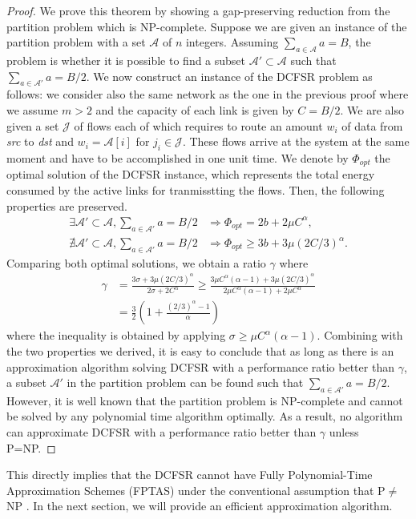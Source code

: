 \documentclass[10pt, conference, compsocconf]{IEEEtran}
\begin{document}
\begin{proof}
We prove this theorem by showing a gap-preserving reduction from the partition problem which is NP-complete. Suppose we are given an instance of the partition problem with a set $\mathcal{A}$ of $n$ integers. Assuming $\sum_{a \in \mathcal{A}} a = B$, the problem is whether it is possible to find a subset $\mathcal{A}' \subset \mathcal{A}$ such that $\sum_{a \in \mathcal{A}'} a = B/2$.  We now construct an instance of the DCFSR problem as follows:  we consider also the same network as the one in the previous proof where we assume $m > 2$ and the capacity of each link is given by $C = B/2$. We are also given a set $\mathcal{J}$ of flows each of which requires to route an amount $w_i$ of data from \emph{src} to \emph{dst} and $w_i = \mathcal{A}[i]$ for $j_i \in \mathcal{J}$. These flows arrive at the system at the same moment and have to be accomplished in one unit time. We denote by $\Phi_{opt}$ the optimal solution of the DCFSR instance, which represents the total energy consumed by the active links for tranmisstting the flows. Then, the following properties are preserved.
	\begin{align}
		\exists \mathcal{A}' \subset \mathcal{A}, \sum_{a \in \mathcal{A}'} a = B/2 	&\Longrightarrow \Phi_{opt} = 2b + 2 \mu C^{\alpha}, \nonumber\\
		\nexists \mathcal{A}' \subset \mathcal{A}, \sum_{a \in \mathcal{A}'} a = B/2 	&\Longrightarrow \Phi_{opt} \geq 3b + 3\mu (2C/3)^{\alpha}.\nonumber
	\end{align}
	Comparing both optimal solutions, we obtain a ratio $\gamma$ where
	\begin{align}
		\gamma 	&= \frac{3\sigma + 3 \mu \left(2C/3\right)^{\alpha}}{2\sigma + 2 C^{\alpha}} \geq \frac{3 \mu C^{\alpha}(\alpha - 1) + 3 \mu\left(2C/3\right)^{\alpha}}{2 \mu C^{\alpha}(\alpha - 1) + 2 \mu C^{\alpha}} \nonumber\\
				&= \frac{3}{2} \left(1 + \frac{(2/3)^{\alpha}-1}{ \alpha}\right) 
	\end{align}
where the inequality is obtained by applying $\sigma \geq \mu C^{\alpha}(\alpha - 1)$.
Combining with the two properties we derived, it is easy to conclude that as long as there is an approximation algorithm solving DCFSR with a performance ratio better than $\gamma$, a subset $\mathcal{A}'$ in the partition problem can be found such that $\sum_{a \in \mathcal{A}'} a = B/2$. However, it is well known that the partition problem is NP-complete and cannot be solved by any polynomial time algorithm optimally. As a result, no algorithm can approximate DCFSR with a performance ratio better than $\gamma$ unless P=NP.
\end{proof}
This directly implies that the DCFSR cannot have Fully Polynomial-Time Approximation Schemes (FPTAS) under the conventional assumption that P$\neq$NP \cite{Vazirani-2004}. In the next section, we will provide an efficient approximation algorithm.
\end{document}
